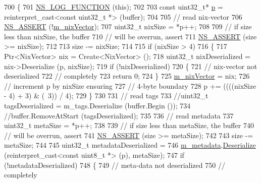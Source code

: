 \begin{DoxyCode}
700 \{
701   \hyperlink{log-macros-disabled_8h_a90b90d5bad1f39cb1b64923ea94c0761}{NS\_LOG\_FUNCTION} (\textcolor{keyword}{this});
702 
703   \textcolor{keyword}{const} uint32\_t* \hyperlink{lte__link__budget_8m_ac9de518908a968428863f829398a4e62}{p} = \textcolor{keyword}{reinterpret\_cast<}\textcolor{keyword}{const }uint32\_t *\textcolor{keyword}{>} (buffer);
704 
705   \textcolor{comment}{// read nix-vector}
706   \hyperlink{assert_8h_a6dccdb0de9b252f60088ce281c49d052}{NS\_ASSERT} (!\hyperlink{classns3_1_1Packet_af6fe17f2fb778ccd84af5c3c950ee4f4}{m\_nixVector});
707   uint32\_t nixSize = *p++;
708 
709   \textcolor{comment}{// if size less than nixSize, the buffer }
710   \textcolor{comment}{// will be overrun, assert}
711   \hyperlink{assert_8h_a6dccdb0de9b252f60088ce281c49d052}{NS\_ASSERT} (size >= nixSize);
712 
713   size -= nixSize;
714 
715   \textcolor{keywordflow}{if} (nixSize > 4)
716     \{
717       Ptr<NixVector> nix = Create<NixVector> ();
718       uint32\_t nixDeserialized = nix->Deserialize (p, nixSize);
719       \textcolor{keywordflow}{if} (!nixDeserialized)
720         \{
721           \textcolor{comment}{// nix-vector not deserialized}
722           \textcolor{comment}{// completely}
723           \textcolor{keywordflow}{return} 0;
724         \}
725       \hyperlink{classns3_1_1Packet_af6fe17f2fb778ccd84af5c3c950ee4f4}{m\_nixVector} = nix;
726       \textcolor{comment}{// increment p by nixSize ensuring}
727       \textcolor{comment}{// 4-byte boundary}
728       p += ((((nixSize - 4) + 3) & (~3)) / 4);
729     \}
730 
731   \textcolor{comment}{// read tags}
733 \textcolor{comment}{}  \textcolor{comment}{//uint32\_t tagsDeserialized = m\_tags.Deserialize (buffer.Begin ());}
734   \textcolor{comment}{//buffer.RemoveAtStart (tagsDeserialized);}
735 
736   \textcolor{comment}{// read metadata}
737   uint32\_t metaSize = *p++;
738 
739   \textcolor{comment}{// if size less than metaSize, the buffer }
740   \textcolor{comment}{// will be overrun, assert}
741   \hyperlink{assert_8h_a6dccdb0de9b252f60088ce281c49d052}{NS\_ASSERT} (size >= metaSize);
742 
743   size -= metaSize;
744 
745   uint32\_t metadataDeserialized = 
746     \hyperlink{classns3_1_1Packet_af3f95fba7966191bd152bcedd5fbcd6b}{m\_metadata}.\hyperlink{classns3_1_1PacketMetadata_a88efb0a5ff0339b9430ded4e3452397d}{Deserialize} (reinterpret\_cast<const uint8\_t *> (p), metaSize);
747   \textcolor{keywordflow}{if} (!metadataDeserialized)
748     \{
749       \textcolor{comment}{// meta-data not deserialized }
750       \textcolor{comment}{// completely}

\end{DoxyCode}
